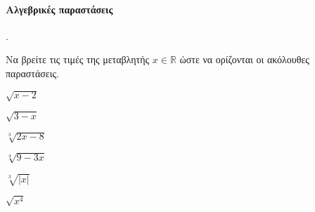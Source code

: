 \documentclass[11pt,a4paper,twocolumn]{article}
\newcounter{askhsh}
\newcommand{\askhsh}{\large\theaskhsh.\ \addtocounter{askhsh}{1}}
\begin{document}
\paragraph{Αλγεβρικές παραστάσεις}
\askhsh Να βρείτε τις τιμές της μεταβλητής $x\in\mathbb{R}$ ώστε να ορίζονται οι ακόλουθες παραστάσεις.
\begin{multicols}{2}
\begin{alist}
\item $\sqrt{x-2}$
\item $\sqrt{3-x}$
\item $\sqrt[3]{2x-8}$
\item $\sqrt[4]{9-3x}$
\item $\sqrt[3]{|x|}$
\item $\sqrt{x^4}$
\end{alist}
\end{multicols}
\end{document}

